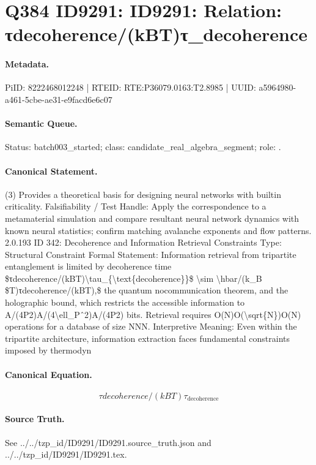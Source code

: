 \section*{Q384 ID9291: ID9291: Relation: τdecoherence/(kBT)τ\_decoherence}
\paragraph{Metadata.}
PiID: 8222468012248 | RTEID: RTE:P36079.0163:T2.8985 | UUID: a5964980-a461-5cbe-ae31-e9facd6e6c07

\paragraph{Semantic Queue.}
Status: batch003\_started; class: candidate\_real\_algebra\_segment; role: .

\paragraph{Canonical Statement.}
(3) Provides a theoretical basis for designing neural networks with builtin criticality. Falsifiability / Test Handle: Apply the correspondence to a metamaterial simulation and compare resultant neural network dynamics with known neural statistics; confirm matching avalanche exponents and flow patterns. 2.0.193 ID 342: Decoherence and Information Retrieval Constraints Type: Structural Constraint Formal Statement: Information retrieval from tripartite entanglement is limited by decoherence time \$τdecoherence/(kBT)\textbackslash{}tau\_\{\textbackslash{}text\{decoherence\}\}\$ \textbackslash{}sim \textbackslash{}hbar/(k\_B \$T)τdecoherence/(kBT),\$ the quantum nocommunication theorem, and the holographic bound, which restricts the accessible information to A/(4P2)A/(4\textbackslash{}ell\_Pˆ2)A/(4P2) bits. Retrieval requires O(N)O(\textbackslash{}sqrt\{N\})O(N) operations for a database of size NNN. Interpretive Meaning: Even within the tripartite architecture, information extraction faces fundamental constraints imposed by thermodyn

\paragraph{Canonical Equation.}
\[
τdecoherence/(kBT)\tau_{\text{decoherence}}
\]

\paragraph{Source Truth.}
See ../../tzp\_id/ID9291/ID9291.source\_truth.json and ../../tzp\_id/ID9291/ID9291.tex.
